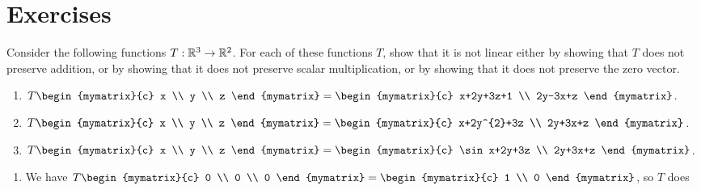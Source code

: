 \section*{Exercises}

\begin{ex}
  Consider the following functions $T:\mathbb{R}^{3}\rightarrow \mathbb{R}^{2}$.
  For each of these functions $T$, show that it is not linear either
  by showing that $T$ does not preserve addition, or by showing that it
  does not preserve scalar multiplication, or by showing that it does
  not preserve the zero vector.
  \begin{enumerate}
  \item $T\begin{mymatrix}{c} x \\ y \\ z \end{mymatrix}
    = \begin{mymatrix}{c}
      x+2y+3z+1 \\
      2y-3x+z
    \end{mymatrix}$.
  \item $T\begin{mymatrix}{c} x \\ y \\ z \end{mymatrix}
    = \begin{mymatrix}{c}
      x+2y^{2}+3z \\
      2y+3x+z
    \end{mymatrix}$.
  \item $T\begin{mymatrix}{c} x \\ y \\ z \end{mymatrix}
    = \begin{mymatrix}{c}
      \sin x+2y+3z \\
      2y+3x+z
    \end{mymatrix}$.
  \end{enumerate}
  \begin{sol}
    \begin{enumerate}
    \item We have $T\begin{mymatrix}{c} 0 \\ 0 \\ 0 \end{mymatrix}
      = \begin{mymatrix}{c} 1 \\ 0 \end{mymatrix}$, so $T$ does

\end{enumerate}
\end{sol}
\end{ex}
